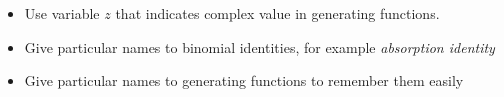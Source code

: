 ﻿\begin{itemize}
    \item Use variable $z$ that indicates complex value in generating functions.
    \item Give particular names to binomial identities, for example \textit{absorption identity}
    \item Give particular names to generating functions to remember them easily
\end{itemize}
